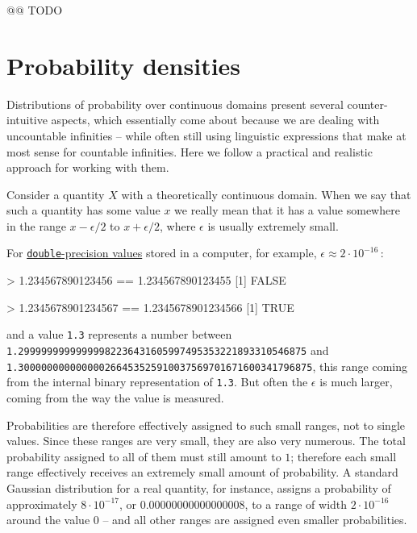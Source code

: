 \documentclass[
  a4paper,
  DIV=11,
  numbers=noendperiod,
  oneside]{scrreprt}
\newenvironment{Shaded}{\begin{snugshade}}{\end{snugshade}}
\newcommand{\ConstantTok}[1]{\textcolor[rgb]{0.56,0.35,0.01}{#1}}
\newcommand{\DecValTok}[1]{\textcolor[rgb]{0.68,0.00,0.00}{#1}}
\newcommand{\FloatTok}[1]{\textcolor[rgb]{0.68,0.00,0.00}{#1}}
\newcommand{\NormalTok}[1]{\textcolor[rgb]{0.00,0.23,0.31}{#1}}
\newcommand{\SpecialCharTok}[1]{\textcolor[rgb]{0.37,0.37,0.37}{#1}}
\begin{document}
@@ TODO

\hypertarget{probability-densities}{%
\section{Probability densities}\label{probability-densities}}

Distributions of probability over continuous domains present several
counter-intuitive aspects, which essentially come about because we are
dealing with uncountable infinities -- while often still using
linguistic expressions that make at most sense for countable infinities.
Here we follow a practical and realistic approach for working with them.

Consider a quantity \(X\) with a theoretically continuous domain. When
we say that such a quantity has some value \(x\) we really mean that it
has a value somewhere in the range \(x -\epsilon/2\) to
\(x+\epsilon/2\), where \(\epsilon\) is usually extremely small.

For \href{https://rdrr.io/r/base/double.html}{\texttt{double}-precision
values} stored in a computer, for example,
{\(\epsilon \approx 2\cdot 10^{-16}\)\,:}

\begin{Shaded}
\begin{Highlighting}[]
\SpecialCharTok{\textgreater{}} \FloatTok{1.234567890123456} \SpecialCharTok{==} \FloatTok{1.234567890123455}
\NormalTok{[}\DecValTok{1}\NormalTok{] }\ConstantTok{FALSE}

\SpecialCharTok{\textgreater{}} \FloatTok{1.2345678901234567} \SpecialCharTok{==} \FloatTok{1.2345678901234566}
\NormalTok{[}\DecValTok{1}\NormalTok{] }\ConstantTok{TRUE}
\end{Highlighting}
\end{Shaded}

and a value \texttt{1.3} represents a number between
{\texttt{1.29999999999999982236431605997495353221893310546875}} and
{\texttt{1.300000000000000266453525910037569701671600341796875}}, this
range coming from the internal binary representation of \texttt{1.3}.
But often the \(\epsilon\) is much larger, coming from the way the value
is measured.

Probabilities are therefore effectively assigned to such small ranges,
not to single values. Since these ranges are very small, they are also
very numerous. The total probability assigned to all of them must still
amount to \(1\); therefore each small range effectively receives an
extremely small amount of probability. A standard Gaussian distribution
for a real quantity, for instance, assigns a probability of
approximately \(8\cdot 10^{-17}\), or {\(0.00000000000000008\)}, to a
range of width \(2\cdot 10^{-16}\) around the value \(0\) -- and all
other ranges are assigned even smaller probabilities.
\end{document}
